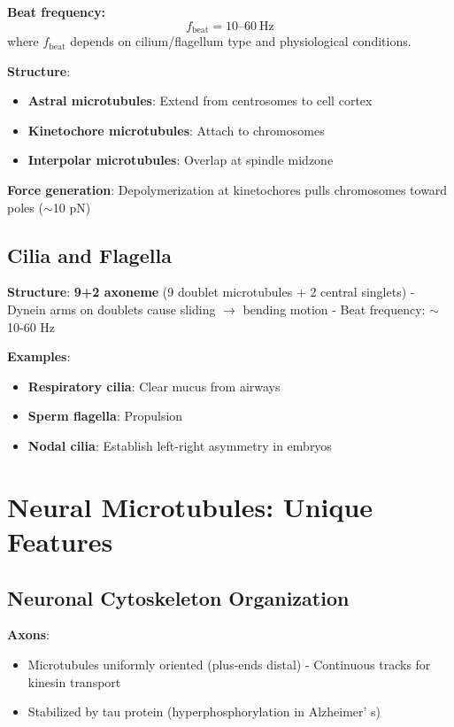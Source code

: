 \textbf{Beat frequency:}
\begin{equation}
f_{\mathrm{beat}} = 10\text{--}60\ \mathrm{Hz}
\end{equation}
where $f_{\mathrm{beat}}$ depends on cilium/flagellum type and physiological conditions.

\textbf{Structure}:
\begin{itemize}
\item \textbf{Astral microtubules}: Extend from
centrosomes to cell cortex
\item \textbf{Kinetochore microtubules}: Attach
to chromosomes
\item \textbf{Interpolar microtubules}: Overlap at spindle
midzone
\end{itemize}


\textbf{Force generation}: Depolymerization at kinetochores pulls
chromosomes toward poles ($\sim$10 pN)

\subsection{Cilia and Flagella}\label{cilia-and-flagella}

\textbf{Structure}: \textbf{9+2 axoneme} (9 doublet microtubules + 2
central singlets) - Dynein arms on doublets cause sliding
$\rightarrow$ bending motion - Beat frequency:
$\sim$10-60 Hz

\textbf{Examples}:
\begin{itemize}
\item \textbf{Respiratory cilia}: Clear mucus from
airways
\item \textbf{Sperm flagella}: Propulsion
\item \textbf{Nodal cilia}:
Establish left-right asymmetry in embryos
\end{itemize}


\section{Neural Microtubules: Unique Features}
\label{sec:neural-microtubules}

\subsection{Neuronal Cytoskeleton
Organization}\label{neuronal-cytoskeleton-organization}

\textbf{Axons}:
\begin{itemize}
\item Microtubules uniformly oriented (plus-ends distal) -
Continuous tracks for kinesin transport
\item Stabilized by tau protein
(hyperphosphorylation in Alzheimer' s)
\end{itemize}


